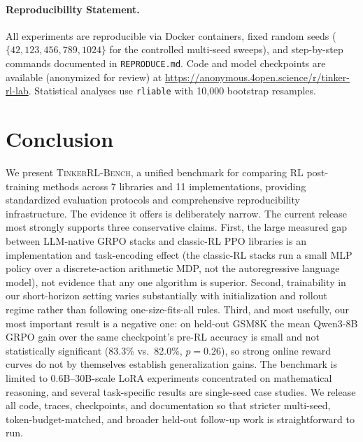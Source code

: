 \documentclass[manuscript,review,anonymous]{acmart}
\newcommand{\ours}{\textsc{TinkerRL-Bench}}
\begin{document}
\paragraph{Reproducibility Statement.}
\sloppy
All experiments are reproducible via Docker containers, fixed random seeds ($\{42, 123, 456, 789, 1024\}$ for the controlled multi-seed sweeps), and step-by-step commands documented in \texttt{REPRODUCE.md}. Code and model checkpoints are available (anonymized for review) at \url{https://anonymous.4open.science/r/tinker-rl-lab}. Statistical analyses use \texttt{rliable} with 10,000 bootstrap resamples.

\section{Conclusion}
\label{sec:conclusion}

We present \ours{}, a unified benchmark for comparing RL post-training methods
across 7 libraries and 11 implementations, providing standardized evaluation
protocols and comprehensive reproducibility infrastructure. The evidence it
offers is deliberately narrow. The current release most strongly supports
three conservative claims. First, the large measured gap between LLM-native
GRPO stacks and classic-RL PPO libraries is an implementation and
task-encoding effect (the classic-RL stacks run a small MLP policy over a
discrete-action arithmetic MDP, not the autoregressive language model), not
evidence that any one algorithm is superior. Second, trainability in our
short-horizon setting varies substantially with initialization and rollout
regime rather than following one-size-fits-all rules. Third, and most
usefully, our most important result is a negative one: on held-out GSM8K the
mean Qwen3-8B GRPO gain over the same checkpoint's pre-RL accuracy is small and
not statistically significant (83.3\% vs.\ 82.0\%, $p{=}0.26$), so strong
online reward curves do not by themselves establish generalization gains. The
benchmark is limited to 0.6B--30B-scale LoRA experiments concentrated on
mathematical reasoning, and several task-specific results are single-seed case
studies. We release all code, traces, checkpoints, and documentation so that
stricter multi-seed, token-budget-matched, and broader held-out follow-up work
is straightforward to run.



\end{document}
